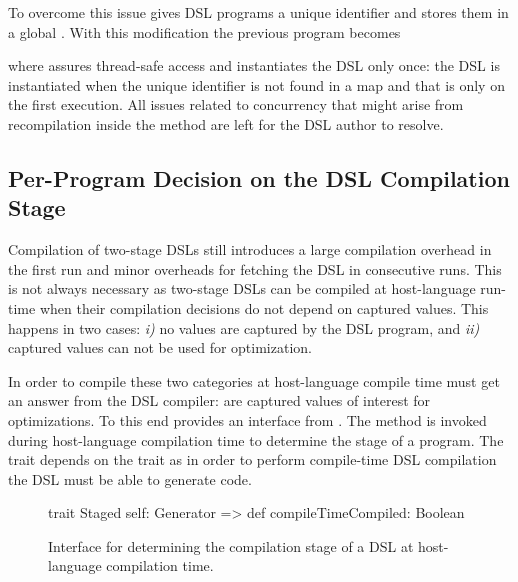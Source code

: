 To overcome this issue \yy gives DSL programs a unique identifier and stores them
 in a global . With this modification the previous program becomes\begin{lstparagraph}
val prog = YYStorage.programs.computeIfAbsent(<UID>, { _ =>
  new VectorDSL {
    def main() = lift(Vector).fill(lift(1000), lift(1))
})
prog.execute[Vector[Int]]()
\end{lstparagraph}
where  assures thread-safe access and instantiates the DSL only once: the DSL is instantiated
 when the unique identifier is not found in a map and that is only on the first execution.
 All issues related to concurrency that might arise from recompilation inside the 
 method are left for the DSL author to resolve.



\subsection{Per-Program Decision on the DSL Compilation Stage}
\label{sec:per-program-decision}

Compilation of two-stage DSLs still introduces a large compilation overhead in the first run
 and minor overheads for fetching the DSL in consecutive runs. This is not always necessary
 as two-stage DSLs can be compiled at host-language run-time when their compilation decisions
 do not depend on captured values. This happens in two cases: \emph{i)} no values are captured by the DSL program,
 and \emph{ii)} captured values can not be used for optimization.

In order to compile these two categories at host-language compile time \yy must get an
 answer from the DSL compiler: are captured values of interest for optimizations. To this
 end \yy provides an interface  from . The method
  is invoked during host-language compilation time to determine the
 stage of a program. The trait  depends on the trait  as in
 order to perform compile-time DSL compilation the DSL must be able to generate code.

\begin{figure}
\begin{listingtiny}
trait Staged { self: Generator =>
  def compileTimeCompiled: Boolean
}
\end{listingtiny}
\caption{Interface for determining the compilation stage of a DSL at host-language compilation time.}
  \label{fig:staged}
\end{figure}

